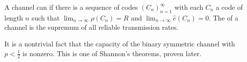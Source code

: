 \begin{definition}[Capacity]
    A channel can  if there is a sequence of codes $(C_n)_{n=1}^\infty$ with each $C_n$ a code of length $n$ such that $\lim_{n \to \infty} \rho(C_n) = R$ and $\lim_{n \to \infty} \hat e(C_n) = 0$.
    The  of a channel is the supremum of all reliable transmission rates.
\end{definition}

It is a nontrivial fact that the capacity of the binary symmetric channel with $p < \frac{1}{2}$ is nonzero.
This is one of Shannon's theorems, proven later.
